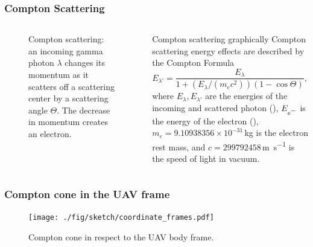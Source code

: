 \documentclass[aspectratio=169]{beamer}
\newcommand{\minus}{\scalebox{0.75}[1.0]{$-$}}
\begin{document}
\begin{frame}[noframenumbering]
  \frametitle{Compton Scattering}

  \begin{columns}[c]


  \begin{figure}[!t]
    \centering
    \resizebox{0.75\textwidth}{!}{%
      
    }
    \caption{
      Compton scattering: an incoming gamma photon $\lambda$ changes its momentum as it scatters off a scattering center by a scattering angle $\Theta$.
      The decrease in momentum creates an electron.
    }
    \label{fig:compton_scattering}
  \end{figure}


  \begin{block}{Compton scattering graphically}
  Compton scattering energy effects are described by the Compton Formula
  \begin{equation}
    E_{\lambda'} = \frac{E_{\lambda}}{1 + \left(E_{\lambda} / \left(m_e c^2\right)\right)\left(1 - \cos\Theta\right)},
    \label{eq:compton_formulae}
  \end{equation}
  where $E_{\lambda}, E_{\lambda'}$ are the energies of the incoming and scattered photon (\si{\joul}), $E_{e^{\minus}}$ is the energy of the electron (\si{\joul}), $m_e = 9.10938356\times10^{-31}\,$\si{\kilogram} is the electron rest mass, and $c = 299792458$\,\si{\meter\per\second} is the speed of light in vacuum.
  \end{block}

  \end{columns}

\end{frame}



\begin{frame}[noframenumbering]
\frametitle{Compton cone in the UAV frame}

\begin{figure}
  \texttt{[image: ./fig/sketch/coordinate\_frames.pdf]}
  \caption{Compton cone in respect to the UAV body frame.}
\end{figure}

\end{frame}
\end{document}
